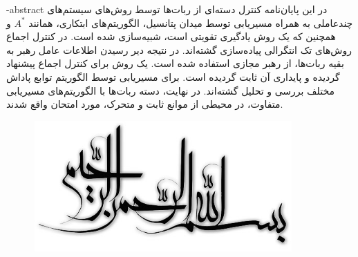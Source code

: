 
\fa-abstract{
در این پایان‌نامه کنترل دسته‌ای از ربات‌ها توسط روش‌های سیستم‌های چندعاملی به همراه مسیریابی توسط میدان پتانسیل، الگوریتم‌های ابتکاری، همانند $A^*$ و همچنین  که یک روش یادگیری تقویتی است، شبیه‌سازی شده است. در کنترل اجماع روش‌های تک انتگرالی پیاده‌سازی گشته‌اند. در نتیجه دیر رسیدن اطلاعات عامل رهبر به بقیه ربات‌ها، از رهبر مجازی استفاده شده است. یک روش برای کنترل اجماع پیشنهاد گردیده و پایداری آن ثابت گردیده است. برای مسیریابی توسط الگوریتم  توابع پاداش مختلف بررسی و تحلیل گشته‌اند. در نهایت، دسته ربات‌ها با الگوریتم‌های مسیریابی متفاوت، در محیطی از موانع ثابت و متحرک، مورد امتحان واقع شدند.
}





\AUTtitle
\vspace*{7cm}
\thispagestyle{empty}
\begin{center}
\includegraphics[height=5cm,width=12cm]{besm}
\end{center}